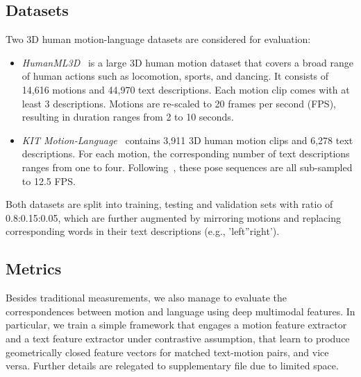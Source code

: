 \documentclass[runningheads]{llncs}
\newcommand{\beforesubsection}{\vspace{-2mm}}
\newcommand{\aftersubsection}{\vspace{-2mm}}
\begin{document}
\subsection{Datasets}
\aftersubsection
Two 3D human motion-language datasets are considered for evaluation:
\begin{itemize}
    \item \textit{HumanML3D}~\cite{guo2022generating} is a large 3D human motion dataset that covers a broad range of human actions such as locomotion, sports, and dancing. It consists of 14,616 motions and 44,970 text descriptions. Each motion clip comes with at least 3 descriptions. Motions are re-scaled to 20 frames per second (FPS), resulting in duration ranges from 2 to 10 seconds. 
    \item \textit{KIT Motion-Language}~\cite{plappert2016kit} contains 3,911 3D human motion clips and 6,278 text descriptions. For each motion, the corresponding number of text descriptions ranges from one to four. Following~\cite{ahuja2019language2pose,ghosh2021synthesis}, these pose sequences are all sub-sampled to 12.5 FPS.
\end{itemize}

Both datasets are split into training, testing and validation sets with ratio of 0.8:0.15:0.05, which are further augmented by mirroring motions and replacing corresponding words in their text descriptions (e.g., 'left''right').

\beforesubsection
\subsection{Metrics}
\aftersubsection

Besides traditional measurements, we also manage to evaluate the correspondences between motion and language using deep multimodal features. In particular, we train a simple framework that engages a motion feature extractor and a text feature extractor under contrastive assumption, that learn to produce geometrically closed feature vectors for matched text-motion pairs, and vice versa. Further details are relegated to supplementary file due to limited space. 
\end{document}
